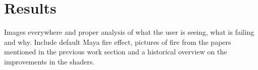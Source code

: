 \chapter{Results}
\label{ch:results}

Images everywhere and proper analysis of what the user is seeing, what is failing and why.
Include default Maya fire effect, pictures of fire from the papers mentioned in the previous work section and a historical overview on the improvements in the shaders.